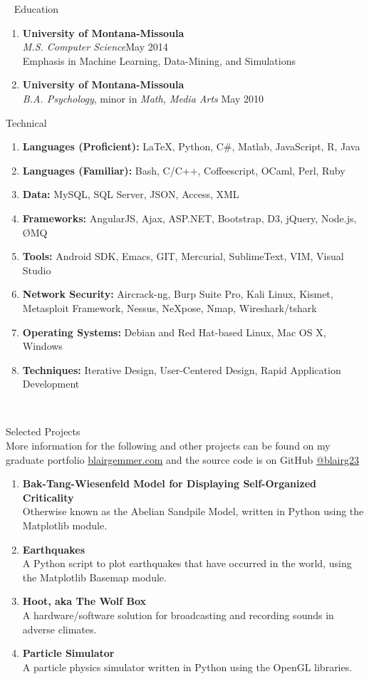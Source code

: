 \documentclass[oneside]{article}%
\begin{document}
\
\noindent
\huge{Education}
\small
\begin{enumerate}[]
\item \textbf{University of Montana-Missoula}\\
\vspace{2mm}
	\textit{M.S. Computer Science}\hfill May 2014\\
	Emphasis in Machine Learning, Data-Mining, and Simulations
	\
\item \textbf{University of Montana-Missoula}\\
	\textit{B.A. Psychology}, minor in \textit{Math, Media Arts} \hfill May 2010
	\
\end{enumerate}

\newpage
\noindent
\huge{Technical}
\normalsize
\begin{enumerate}[]
	\item \textbf{Languages (Proficient):} \LaTeX, Python, C\#, Matlab, JavaScript, R, Java
	\item \textbf{Languages (Familiar):} Bash, C/C++, Coffeescript, OCaml, Perl, Ruby
	\item \textbf{Data:} MySQL, SQL Server, JSON, Access, XML
	\item \textbf{Frameworks:} AngularJS, Ajax, ASP.NET, Bootstrap, D3, jQuery, Node.js, ØMQ
	\item \textbf{Tools:} Android SDK, Emacs, GIT, Mercurial, SublimeText, VIM, Visual Studio
	\item \textbf{Network Security:} Aircrack-ng, Burp Suite Pro, Kali Linux, Kismet, Metasploit Framework, Nessus, NeXpose, Nmap, Wireshark/tshark
	\item \textbf{Operating Systems:} Debian and Red Hat-based Linux, Mac OS X, Windows
	\item \textbf{Techniques:} Iterative Design, User-Centered Design, Rapid Application Development
\end{enumerate}

\

\noindent
\huge{Selected Projects}\\
\normalsize
More information for the following and other projects can be found on my graduate portfolio \href{blairgemmer.com}{blairgemmer.com} and the source code is on GitHub \href{https://github.com/blairg23}{@blairg23}
\begin{enumerate}[]
	\item \textbf{Bak-Tang-Wiesenfeld Model for Displaying Self-Organized\\ Criticality}\\
		Otherwise known as the Abelian Sandpile Model, written in Python using the Matplotlib module.
	\item \textbf{Earthquakes}\\
		A Python script to plot earthquakes that have occurred in the world, using the Matplotlib Basemap module.
	\item \textbf{Hoot, aka The Wolf Box}\\
		A hardware/software solution for broadcasting and recording sounds in adverse climates.
	\item \textbf{Particle Simulator}\\
		A particle physics simulator written in Python using the OpenGL libraries.
\end{enumerate}
\end{document}
